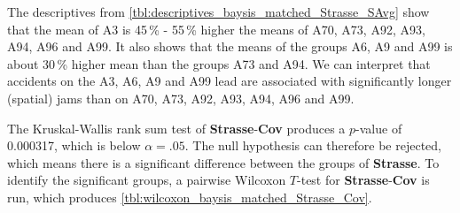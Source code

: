 The descriptives from \cref{tbl:descriptives_baysis_matched_Strasse_SAvg} show that the mean of A3 is 45\,\% - 55\,\% higher the means of A70, A73, A92, A93, A94, A96 and A99. It also shows that the means of the groups A6, A9 and A99 is about 30\,\% higher mean than the groups A73 and A94. We can interpret that accidents on the A3, A6, A9 and A99 lead are associated with significantly longer (spatial) jams than on A70, A73, A92, A93, A94, A96 and A99.

The Kruskal-Wallis rank sum test of \textbf{Strasse}-\textbf{Cov} produces a $p$-value of 0.000317, which is below $\alpha=.05$. The null hypothesis can therefore be rejected, which means there is a significant difference between the groups of \textbf{Strasse}. To identify the significant groups, a pairwise Wilcoxon $T$-test for \textbf{Strasse}-\textbf{Cov} is run, which produces \cref{tbl:wilcoxon_baysis_matched_Strasse_Cov}. 
